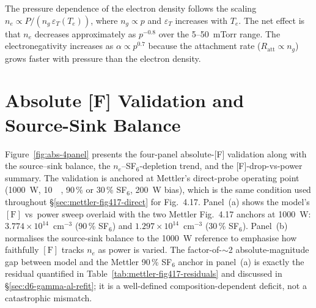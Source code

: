 \documentclass[11pt,a4paper]{report}
\begin{document}
The pressure dependence of the electron density follows the scaling $n_e \propto P/(n_g\,\varepsilon_T(T_e))$, where $n_g \propto p$ and $\varepsilon_T$ increases with $T_e$.  The net effect is that $n_e$ decreases approximately as $p^{-0.8}$ over the 5--50~mTorr range.  The electronegativity increases as $\alpha \propto p^{0.7}$ because the attachment rate ($R_\mathrm{att} \propto n_g$) grows faster with pressure than the electron density.


\section{Absolute [F] Validation and Source-Sink Balance}
\label{sec:abs-validation}

Figure~\ref{fig:abs-4panel} presents the four-panel absolute-[F] validation along with the source--sink balance, the $n_e$--SF$_6$-depletion trend, and the [F]-drop-vs-power summary.  The validation is anchored at Mettler's direct-probe operating point (\SI{1000}{\watt}, \SI{10}{\milli\torr}, 90\,\% or 30\,\% SF$_6$, \SI{200}{\watt} bias), which is the same condition used throughout \S\ref{sec:mettler-fig417-direct} for Fig.~4.17.  Panel~(a) shows the model's $[\mathrm{F}]$ vs~power sweep overlaid with the two Mettler Fig.~4.17 anchors at \SI{1000}{\watt}: $3.774\times 10^{14}$~cm$^{-3}$ (90\,\% SF$_6$) and $1.297\times 10^{14}$~cm$^{-3}$ (30\,\% SF$_6$).  Panel~(b) normalises the source-sink balance to the \SI{1000}{\watt} reference to emphasise how faithfully $[\mathrm{F}]$ tracks $n_e$ as power is varied.  The factor-of-$\sim$2 absolute-magnitude gap between model and the Mettler 90\,\% SF$_6$ anchor in panel~(a) is exactly the residual quantified in Table~\ref{tab:mettler-fig417-residuals} and discussed in \S\ref{sec:d6-gamma-al-refit}; it is a well-defined composition-dependent deficit, not a catastrophic mismatch.
\end{document}
